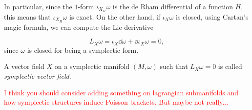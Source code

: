 In particular, since the $1$-form $\iota_{X_H} \omega$ is the de Rham differential of a function $H$, this means that $\iota_{X_H} \omega$ is exact.
On the other hand, if $\iota_X \omega$ is closed, using Cartan's magic formula, we can compute the Lie derivative

\begin{equation*}
    L_X \omega = \iota_X \dd \omega + \dd \iota_X \omega = 0,
\end{equation*}
since $\omega$ is closed for being a symplectic form.

\begin{definition}
    A vector field $X$ on a symplectic manifold $(M, \omega)$ such that $L_X \omega = 0$ is called \emph{symplectic vector field}.
\end{definition}

\textcolor{red}{I think you should consider adding something on lagrangian submanifolds and how symplectic structures induce Poisson brackets. But maybe not really...}